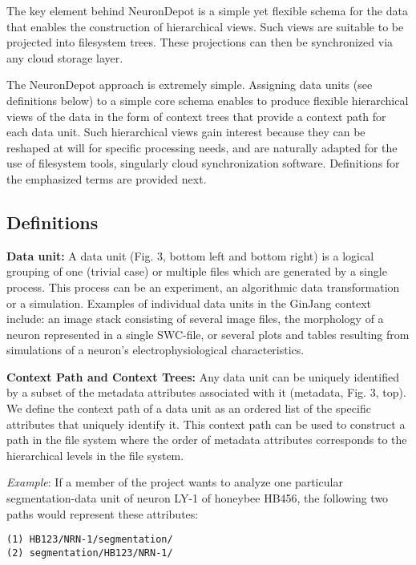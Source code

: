\documentclass{frontiersSCNS} %
\begin{document}
The key element behind NeuronDepot is a simple yet flexible schema for the data
that enables the construction of  hierarchical views. Such views are suitable
to be projected into filesystem trees. These projections can then be
synchronized via any cloud storage layer. 

The NeuronDepot approach is extremely simple. Assigning data units (see
definitions below) to a simple core schema enables to produce flexible
hierarchical views of the data in the form of context trees that provide a
context path for each data unit. Such hierarchical views gain interest because
they can be reshaped at will for specific processing needs, and are naturally
adapted for the use of filesystem tools, singularly cloud synchronization
software. Definitions for the emphasized terms are provided next.


\subsection{Definitions}

\textbf{Data unit:} A data unit (Fig. 3, bottom left and  bottom right) is a
logical grouping of one (trivial case) or multiple files which are generated by
a single process. This process can be an experiment, an algorithmic data
transformation or a simulation. Examples of individual data units in the
GinJang context include: an image stack consisting of several image files, the
morphology of a neuron represented in a single SWC-file, or several plots and
tables resulting from simulations of a neuron's electrophysiological
characteristics.

\textbf{Context Path and Context Trees:} Any data unit can be uniquely
identified by a subset of the metadata attributes associated with it (metadata,
Fig. 3, top). We define the context path of a data unit as an ordered list of
the specific attributes that uniquely identify it. This context path can be
used to construct a path in the file system where the order of metadata
attributes corresponds to the hierarchical levels in the file system. 

\emph{Example}: If a member of the project wants to analyze one particular
segmentation-data unit of neuron LY-1 of honeybee HB456, the following two
paths would represent these attributes:

\begin{lstlisting}[style=display]
(1) HB123/NRN-1/segmentation/
(2) segmentation/HB123/NRN-1/
\end{lstlisting}
\end{document}
